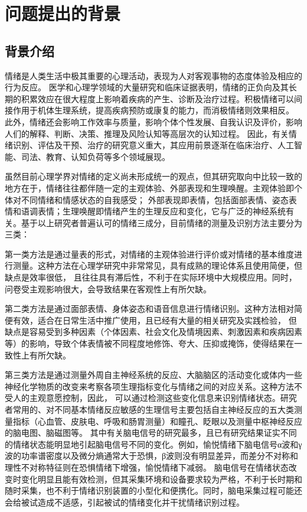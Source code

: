 \section{问题提出的背景}

\subsection{背景介绍}
情绪是人类生活中极其重要的心理活动，表现为人对客观事物的态度体验及相应的行为反应\cite{Mengzhaolan2005}。
医学和心理学领域的大量研究和临床证据表明\cite{Moskowitz2008,Dongyan2012,Ong2006,Caprara2020,Trivedi2020,Trivedi2020}，情绪的正负向及其长期的积累效应在很大程度上影响着疾病的产生、诊断及治疗过程。积极情绪可以间接作用于机体生理系统，提高疾病预防或康复的能力，而消极情绪则效果相反。
此外，情绪还会影响工作效率与质量，影响个体个性发展、自我认识及评价，影响人们的解释、判断、决策、推理及风险认知等高层次的认知过程。
因此，有关情绪识别、评估及干预、治疗的研究意义重大，其应用前景逐渐在临床治疗、人工智能、司法、教育、认知负荷等多个领域展现。

虽然目前心理学界对情绪的定义尚未形成统一的观点，但其研究取向中比较一致的地方在于，情绪往往都伴随一定的主观体验、外部表现和生理唤醒。主观体验即个体对不同情绪和情感状态的自我感受；
外部表现即表情，包括面部表情、姿态表情和语调表情；生理唤醒即情绪产生的生理反应和变化，它与广泛的神经系统有关。基于以上研究者普遍认可的情绪三成分，目前情绪的测量及识别方法主要分为三类：

第一类方法是通过量表的形式，对情绪的主观体验进行评价或对情绪的基本维度进行测量。这种方法在心理学研究中非常常见，具有成熟的理论体系且使用简便，但缺点是效率很低，
且往往具有滞后性，不利于在实际环境中大规模应用。同时，问卷受主观影响很大，会导致结果在客观性上有所欠缺。

第二类方法是通过面部表情、身体姿态和语音信息进行情绪识别。这种方法相对简便有效，适合在日常生活中推广使用，且已经有大量的相关研究及实践检验，
但缺点是容易受到多种因素（个体因素、社会文化及情境因素、刺激因素和疾病因素等）的影响，导致个体表情被不同程度地修饰、夸大、压抑或掩饰，使得结果在一致性上有所欠缺。

第三类方法是通过测量外周自主神经系统的反应、大脑脑区的活动变化或体内一些神经化学物质的改变来考察各项生理指标变化与情绪之间的对应关系。这种方法不受人的主观意愿控制，因此，
可以通过检测这些变化信息来识别情绪状态。研究者常用的、对不同基本情绪反应敏感的生理信号主要包括自主神经反应的五大类测量指标（心血管、皮肤电、呼吸和肠胃测量）和瞳孔、眨眼以及测量中枢神经反应的脑电图、脑磁图等。
其中有关脑电信号的研究最多，且已有研究结果证实不同的情绪状态能明显地引起脑电信号不同的变化。例如，愉悦情绪下脑电信号α波和γ波的功率谱密度以及微分熵通常大于恐惧，β波则没有明显差异，而差分不对称和理性不对称特征则在恐惧情绪下增强，愉悦情绪下减弱\cite{LiuShuang2015}。
脑电信号在情绪状态改变时变化明显且能有效检测，但其采集环境和设备要求较为严格，不利于长时期和随时采集，也不利于情绪识别装置的小型化和便携化。同时，脑电采集过程可能还会给被试造成不适感，引起被试的情绪变化并干扰情绪识别过程。

